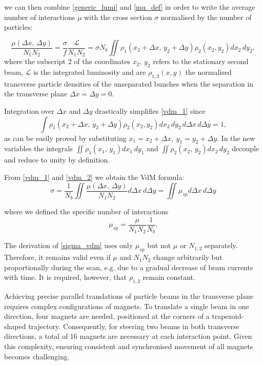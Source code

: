 we can then combine \ref{generic_lumi} and \ref{mu_def} in order to write the average number of interactions $\mu$  with the cross section $\sigma$ normalised by the number of particles:

\begin{equation}
\frac{\mu (\Delta x,\, \Delta y)}{N_1N_2} = \frac{\sigma}{f} \frac{\mathcal{L}}{N_1N_2} = \sigma N_b \iint \rho _1(x_2 + \Delta x,\, y_2 + \Delta y) \rho _2(x_2,y_2) dx_2\, dy_2, \label{vdm_1}
\end{equation}
where the subscript 2 of the coordinates $x_2$, $y_2$ refers to the stationary second beam, $\mathcal{L}$ is the integrated luminosity and are $\rho_{1,2}(x,y)$ the normalised transverse particle densities of the unseparated bunches when the separation in the transverse plane $\Delta x = \Delta y = 0$.

Integration over $\Delta x$ and $\Delta y$ drastically simplifies \eqref{vdm_1} since
\begin{equation} \int \rho _1(x_2 {+} \Delta x,\, y_2 {+} \Delta y) \rho _2(x_2,y_2) dx_2\, dy_2\, d\Delta x\, d\Delta y {=} 1, \label{vdm_2} \end{equation}
as can be easily proved by substituting $x_1=x_2+\Delta x,\ y_1=y_2+\Delta y$. In the new variables the integrals $\iint \rho _1(x_1,\, y_1)dx_1\,dy_1$ and $\iint \rho _2(x_2,\, y_2)dx_2\,dy_2$ decouple and reduce to unity by definition.

From \eqref{vdm_1} and \eqref{vdm_2} we obtain the VdM formula:
\begin{equation}
     \sigma = \frac{1}{N_b} \iint \frac{\mu (\Delta x,\, \Delta y)}{N_1N_2} d\Delta x\, d\Delta y= \iint \mu_{sp}d\Delta x\, d \Delta y \label{sigma_vdm}
    \end{equation}

where we defined the specific number of interactions
\begin{equation}
\mu_{sp}=\frac{\mu}{N_1 N_2}\frac{1}{N_b}.\label{mu_sp}
\end{equation}

The derivation of \eqref{sigma_vdm} uses only $\mu _{sp}$ but not $\mu$ or $N_{1,2}$ separately. Therefore, it remains valid even if $\mu$ and $N_1N_2$ change arbitrarily but proportionally during the scan, e.g. due to a gradual decrease of beam currents with time. It is required, however, that $\rho_{1,2}$ remain constant.

Achieving precise parallel translations of particle beams in the transverse plane requires complex configurations of magnets. To translate a single beam in one direction, four magnets are needed, positioned at the corners of a trapezoid-shaped trajectory. Consequently, for steering two beams in both transverse directions, a total of 16 magnets are necessary at each interaction point. Given this complexity, ensuring consistent and synchronised movement of all magnets becomes challenging.

